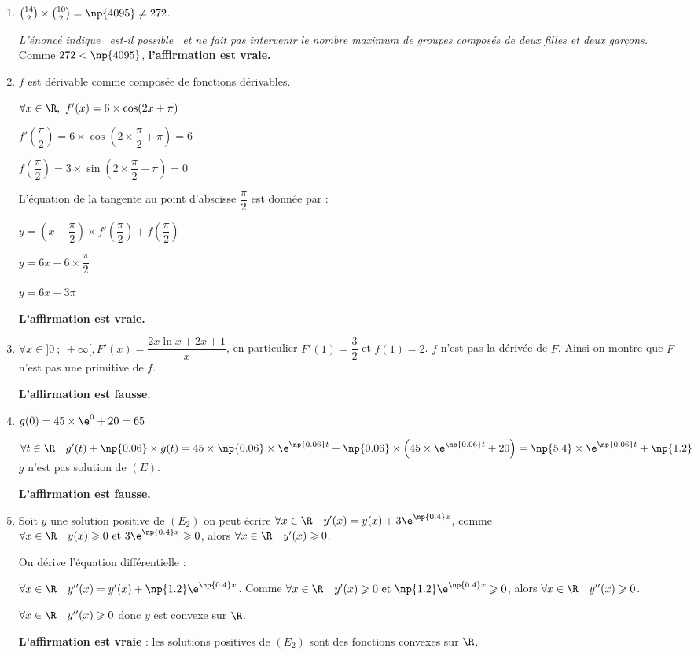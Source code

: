 \begin{enumerate}
	\item $\binom{14}{2}\times \binom{10}{2} = \np{4095} \neq 272$. 

\emph{L'énoncé indique \og{}~est-il possible~\fg{} et ne fait pas intervenir le nombre maximum de groupes composés de deux filles et deux garçons.
}
Comme $272 < \np{4095}$, \textbf{l'affirmation est vraie.}
	
	\item $f$ est dérivable comme composée de fonctions dérivables. 

$\forall x \in \R,~ f'(x) = 6\times \cos(2x+\pi)$	

$f'\left(\dfrac{\pi}{2}\right) = 6\times \cos\left(2\times\dfrac{\pi}{2} +\pi\right) = 6$

$f\left(\dfrac{\pi}{2}\right) = 3\times \sin\left(2\times\dfrac{\pi}{2} +\pi\right) = 0$
	
	L'équation de la tangente au point d'abscisse $\dfrac{\pi}{2}$ est donnée par :
	
	$y = \left(x - \dfrac{\pi}{2}\right)\times f'\left(\dfrac{\pi}{2}\right) + f\left(\dfrac{\pi}{2}\right)$
	
	$y = 6x- 6\times\dfrac{\pi}{2} $
	
	$y= 6x- 3\pi$
	
	\textbf{L'affirmation est vraie.}
	
	\item $\forall x\in ]0~;~+\infty[, F'(x) = \dfrac{2 x \ln x+2 x+1}{x}$, en particulier $F'(1) = \dfrac{3}{2}$ et $f(1) = 2$. $f$ n'est pas la dérivée de $F$. Ainsi on montre que $F$ n'est pas une primitive de $f$.
	
	\textbf{L'affirmation est fausse.}
	
	\item $g(0) =  45 \times \e^{0} +20 = 65$
	
	$\forall t \in \R\quad g'(t) +\np{0.06}\times g(t) = 45\times \np{0.06}\times \e^{ \np{0.06}t} + \np{0.06}\times\left(45\times\e^{ \np{0.06}t}+20\right) =  \np{5.4}\times\e^{ \np{0.06}t}+\np{1.2}$
	$g$ n'est pas solution de $(E)$.
	
	\textbf{L'affirmation est fausse.}
	
	\item Soit $y$ une solution positive de $\left(E_2\right)$ on peut écrire $\forall x \in \R\quad y'(x) = y(x) + 3\e^{\np{0.4}x}$, comme $\forall x \in \R\quad y(x)\geqslant 0\text{ et } 3\e^{\np{0.4}x}\geqslant 0$, alors  $\forall x \in \R\quad y'(x)\geqslant 0$.
	
	On dérive l'équation différentielle :
	
	$\forall x \in \R\quad y''(x) = y'(x) + \np{1.2}\e^{\np{0.4}x}$. Comme $\forall x \in \R\quad y'(x)\geqslant 0\text{ et } \np{1.2}\e^{\np{0.4}x}\geqslant 0$, alors  $\forall x \in \R\quad y''(x)\geqslant 0$.
	
	$\forall x \in \R\quad y''(x)\geqslant 0$ donc $y$ est convexe sur $\R$.
	
	\textbf{L'affirmation est vraie} : les solutions positives de $\left(E_2\right)$ sont des fonctions convexes sur $\R$.
\end{enumerate}

